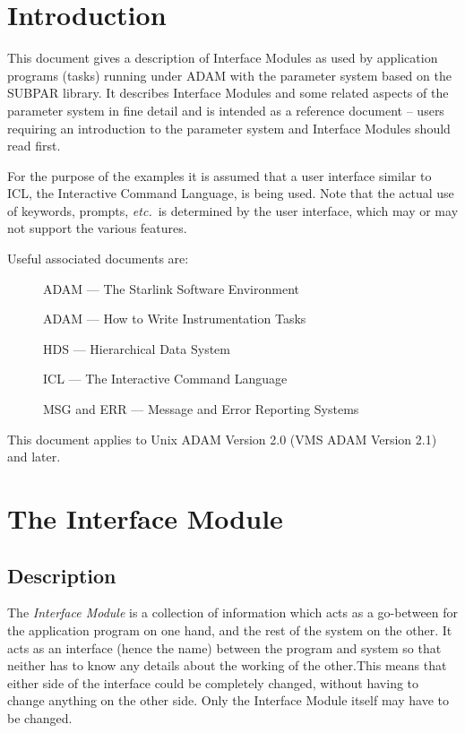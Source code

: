 \documentclass[twoside,11pt,nolof]{starlink}
\begin{document}
\scfrontmatter


\section{Introduction}
This document gives a description of Interface Modules as used by
application programs (tasks) running under ADAM with the parameter system
based on the SUBPAR library.
It describes Interface Modules and some related aspects of the parameter
system in fine detail and is intended as a reference document --
users requiring an introduction to the parameter system and Interface Modules
should read  first.

For the purpose of the examples it is assumed that a user interface
similar to ICL, the Interactive Command Language, is being used.
Note that the actual use of keywords, prompts, \emph{etc.}\ is
determined by the user interface, which may or may not support the
various features.

Useful associated documents are:
\begin{description}
\item[] ADAM --- The Starlink Software Environment
\item[] ADAM --- How to Write Instrumentation Tasks
\item[] HDS --- Hierarchical Data System
\item[] ICL --- The Interactive Command Language
\item[] MSG and ERR --- Message and Error Reporting
Systems
\end{description}
This document applies to Unix ADAM Version 2.0 (VMS ADAM Version 2.1) and
later.

\section{The Interface Module}

\subsection{Description}

The \emph{Interface Module}\/ is a collection of information which acts as a
go-between for the application program on one hand, and the rest of the
system on the other. It acts as an interface (hence the name) between
the program and system so that neither has to know any details about
the working of the other.This means that either
side of the interface could be completely changed, without having to
change anything on the other side.
Only the Interface Module itself may have to be changed.
\end{document}
